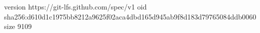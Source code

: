 version https://git-lfs.github.com/spec/v1
oid sha256:d610d1c1975bb8212a9625f02aca4dbd165d945ab9f8d183d79765084ddb0060
size 9109
